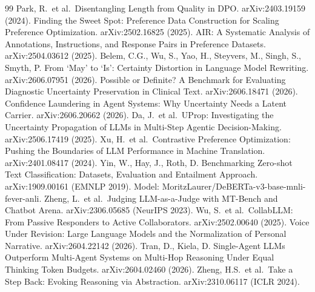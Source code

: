 \documentclass[11pt]{article}
\begin{document}
\begin{thebibliography}{99}
 Park, R.\ et al.\ Disentangling Length from Quality in DPO. arXiv:2403.19159 (2024).
 Finding the Sweet Spot: Preference Data Construction for Scaling Preference Optimization. arXiv:2502.16825 (2025).
 AIR: A Systematic Analysis of Annotations, Instructions, and Response Pairs in Preference Datasets. arXiv:2504.03612 (2025).
 Belem, C.G., Wu, S., Yao, H., Steyvers, M., Singh, S., Smyth, P. From `May' to `Is': Certainty Distortion in Language Model Rewriting. arXiv:2606.07951 (2026).
 Possible or Definite? A Benchmark for Evaluating Diagnostic Uncertainty Preservation in Clinical Text. arXiv:2606.18471 (2026).
 Confidence Laundering in Agent Systems: Why Uncertainty Needs a Latent Carrier. arXiv:2606.20662 (2026).
 Da, J.\ et al.\ UProp: Investigating the Uncertainty Propagation of LLMs in Multi-Step Agentic Decision-Making. arXiv:2506.17419 (2025).
 Xu, H.\ et al.\ Contrastive Preference Optimization: Pushing the Boundaries of LLM Performance in Machine Translation. arXiv:2401.08417 (2024).
 Yin, W., Hay, J., Roth, D. Benchmarking Zero-shot Text Classification: Datasets, Evaluation and Entailment Approach. arXiv:1909.00161 (EMNLP 2019). Model: MoritzLaurer/DeBERTa-v3-base-mnli-fever-anli.
 Zheng, L.\ et al.\ Judging LLM-as-a-Judge with MT-Bench and Chatbot Arena. arXiv:2306.05685 (NeurIPS 2023).
 Wu, S.\ et al.\ CollabLLM: From Passive Responders to Active Collaborators. arXiv:2502.00640 (2025).
 Voice Under Revision: Large Language Models and the Normalization of Personal Narrative. arXiv:2604.22142 (2026).
 Tran, D., Kiela, D. Single-Agent LLMs Outperform Multi-Agent Systems on Multi-Hop Reasoning Under Equal Thinking Token Budgets. arXiv:2604.02460 (2026).
 Zheng, H.S.\ et al.\ Take a Step Back: Evoking Reasoning via Abstraction. arXiv:2310.06117 (ICLR 2024).
\end{thebibliography}
\end{document}
